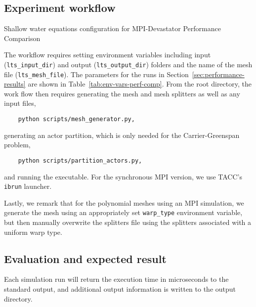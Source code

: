\subsection{Experiment workflow}
\begin{table}
{\footnotesize
\caption{Shallow water equations configuration for MPI-Devastator Performance Comparison}
\label{tab:env-vars-perf-comp}
\centering

}
\end{table}

The workflow requires setting environment variables including input (\lstinline{lts_input_dir}) and output (\lstinline{lts_output_dir}) folders and the name of the mesh file (\lstinline{lts_mesh_file}). The parameters for the runs in Section~\ref{sec:performance-results} are shown in Table~\ref{tab:env-vars-perf-comp}.
From the root directory, the work flow then requires generating the mesh and mesh splitters as well as any input files,
\begin{lstlisting}
    python scripts/mesh_generator.py,
\end{lstlisting}
generating an actor partition, which is only needed for the Carrier-Greenspan problem,
\begin{lstlisting}
    python scripts/partition_actors.py,
\end{lstlisting}
and running the executable. For the synchronous MPI version, we use TACC's \lstinline{ibrun} launcher.

Lastly, we remark that for the polynomial meshes using an MPI simulation, we generate the mesh using an appropriately set \lstinline{warp_type} environment variable, but then manually overwrite the splitters file using the splitters associated with a uniform warp type.

\subsection{Evaluation and expected result}
Each simulation run will return the execution time in microseconds to the standard output, and additional output information is written to the output directory.
